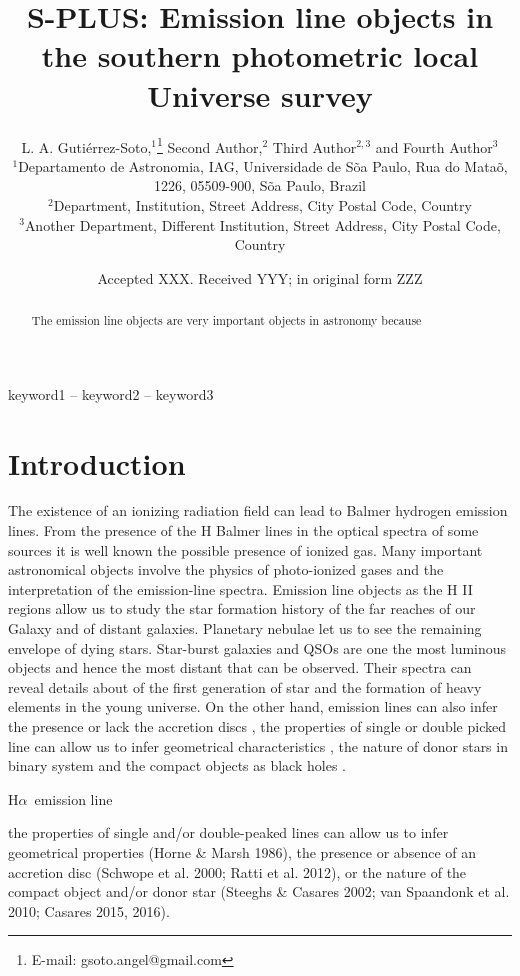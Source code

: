 \documentclass[fleqn,usenatbib]{mnras}
\title[S-PLUS: Emission line objects]{S-PLUS: Emission line objects in the southern photometric local Universe survey}
\author[Guti\'{e}rrez-Soto et al.]{
L. A. Guti\'{e}rrez-Soto,$^{1}$\thanks{E-mail: gsoto.angel@gmail.com}
Second  Author,$^{2}$
Third Author$^{2,3}$
and Fourth Author$^{3}$
\\
$^{1}$Departamento de Astronomia, IAG, Universidade de S\~{o}a Paulo, Rua do Mata\~{o}, 1226, 05509-900, S\~{o}a Paulo, Brazil\\
$^{2}$Department, Institution, Street Address, City Postal Code, Country\\
$^{3}$Another Department, Different Institution, Street Address, City Postal Code, Country
}
\date{Accepted XXX. Received YYY; in original form ZZZ}
\begin{document}
\label{firstpage}
\pagerange{\pageref{firstpage}--\pageref{lastpage}}
\maketitle

\begin{abstract}
The emission line objects are very important objects in astronomy because 
\end{abstract}

\begin{keywords}
keyword1 -- keyword2 -- keyword3
\end{keywords}



\section{Introduction}

The existence of an ionizing radiation field can lead to Balmer hydrogen emission lines. From the presence  of the H Balmer  lines in the optical spectra of some sources it is well known the possible presence of ionized gas. Many important astronomical objects involve the physics of photo-ionized gases and the interpretation of the emission-line spectra. Emission line objects as the H II regions allow us to study the star formation history of the far reaches of our Galaxy and of distant galaxies. Planetary nebulae let us to see the remaining envelope of dying stars. Star-burst galaxies and QSOs are one the most luminous objects and hence the most distant that can be observed. Their spectra can reveal details about of the first generation of star and the formation of heavy elements in the young universe. On the other hand, emission lines can also infer the presence or lack the accretion discs \citep{Schwope:2000, Ratti:2012}, the properties of single or double picked line can allow us to infer geometrical characteristics \citep{Horne:1986}, the nature of  donor stars in binary system \citep{Steeghs:2002, Spaandonk:2010, Casares:2015} and the compact objects as black holes \citep{Casares:2016}.

H{$\alpha$}~emission line 

the properties of
single and/or double-peaked lines can allow us to infer geometrical
properties (Horne \& Marsh 1986), the presence or absence of an
accretion disc (Schwope et al. 2000; Ratti et al. 2012), or the nature
of the compact object and/or donor star (Steeghs \& Casares 2002;
van Spaandonk et al. 2010; Casares 2015, 2016).
\end{document}

